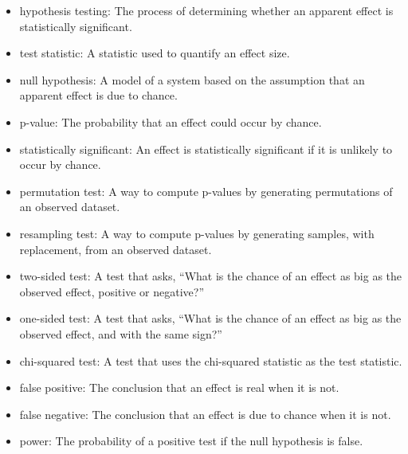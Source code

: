 \documentclass[12pt]{book}
\theoremstyle{exercise}
\begin{document}
\begin{itemize}

\item hypothesis testing: The process of determining whether an apparent
effect is statistically significant.%

\item test statistic: A statistic used to quantify an effect size.%
%

\item null hypothesis: A model of a system based on the assumption that
an apparent effect is due to chance.%

\item p-value: The probability that an effect could occur by chance.%

\item statistically significant: An effect is statistically
  significant if it is unlikely to occur by chance.%
%

\item permutation test: A way to compute p-values by generating
  permutations of an observed dataset.%

\item resampling test: A way to compute p-values by generating
  samples, with replacement, from an observed dataset.%

\item two-sided test: A test that asks, ``What is the chance of an effect
as big as the observed effect, positive or negative?''

\item one-sided test: A test that asks, ``What is the chance of an effect
as big as the observed effect, and with the same sign?''%
%
%
%

\item chi-squared test: A test that uses the chi-squared statistic as
the test statistic.%

\item false positive: The conclusion that an effect is real when it is not.%

\item false negative: The conclusion that an effect is due to chance when it
is not.%

\item power: The probability of a positive test if the null hypothesis
is false.%
%

\end{itemize}
\end{document}

